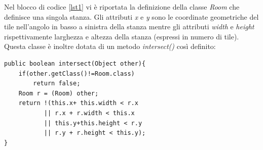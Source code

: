 \documentclass[11pt]{book}
\begin{document}
\par{
Nel blocco di codice \ref{lst1} vi \`e riportata la definizione della classe \emph{Room} che definisce una singola stanza. Gli attributi \emph{x} e \emph{y} sono le coordinate geometriche del tile nell'angolo in basso a sinistra della stanza mentre gli attributi \emph{width} e \emph{height} rispettivamente larghezza e altezza della stanza (espressi in numero di tile). Questa classe \`e inoltre dotata di un metodo \emph{intersect()} cos\`i definito:}

\begin{lstlisting}
public boolean intersect(Object other){
    if(other.getClass()!=Room.class)
        return false;
    Room r = (Room) other;
    return !(this.x+ this.width < r.x 
    	   || r.x + r.width < this.x 
    	   || this.y+this.height < r.y 
           || r.y + r.height < this.y);
}

\end{lstlisting}
\end{document}
